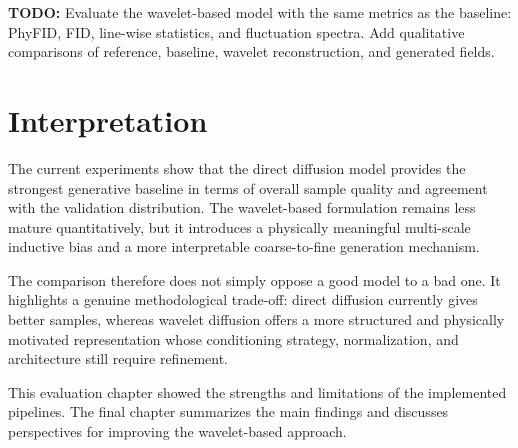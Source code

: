 \textbf{TODO:} Evaluate the wavelet-based model with the same metrics as the
baseline: PhyFID, FID, line-wise statistics, and fluctuation spectra. Add
qualitative comparisons of reference, baseline, wavelet reconstruction, and
generated fields.

\section{Interpretation}

The current experiments show that the direct diffusion model provides the
strongest generative baseline in terms of overall sample quality and agreement
with the validation distribution. The wavelet-based formulation remains less
mature quantitatively, but it introduces a physically meaningful multi-scale
inductive bias and a more interpretable coarse-to-fine generation mechanism.

The comparison therefore does not simply oppose a good model to a bad one. It
highlights a genuine methodological trade-off: direct diffusion currently gives
better samples, whereas wavelet diffusion offers a more structured and
physically motivated representation whose conditioning strategy, normalization,
and architecture still require refinement.

This evaluation chapter showed the strengths and limitations of the implemented pipelines. The final chapter summarizes the main findings and discusses perspectives for improving the wavelet-based approach.
